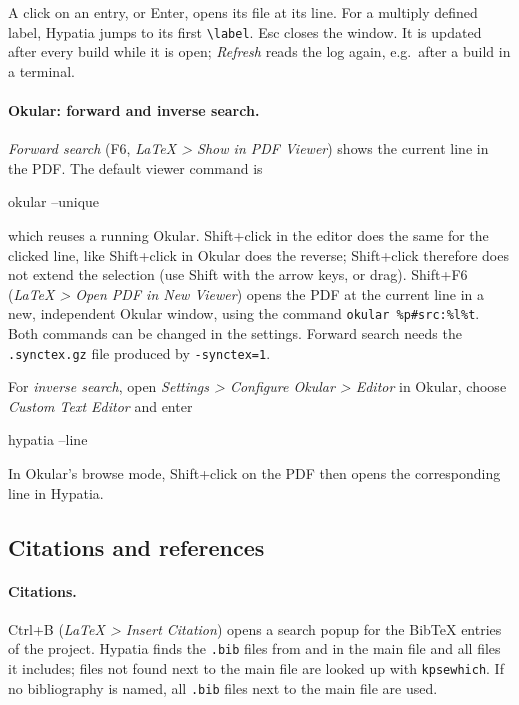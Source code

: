 \documentclass[11pt]{article}
\newcommand{\key}[1]{\textsf{#1}}
\newcommand{\menu}[1]{\textsf{\textit{#1}}}
\begin{document}
    A click on an entry, or \key{Enter}, opens its file at its line. For a multiply defined label, Hypatia jumps to its first \verb+\label+. \key{Esc} closes the window. It is updated after every build while it is open; \emph{Refresh} reads the log again, e.g.\ after a build in a terminal.

    \paragraph{Okular: forward and inverse search.}     \emph{Forward search} (\key{F6}, \menu{LaTeX > Show in PDF Viewer}) shows the current line in the PDF. The default viewer command is
    \begin{Code}
okular --unique %
    \end{Code}
    which reuses a running Okular. \key{Shift}+click in the editor does the same for the clicked line, like \key{Shift}+click in Okular does the reverse; Shift+click therefore does not extend the selection (use \key{Shift} with the arrow keys, or drag). \key{Shift+F6} (\menu{LaTeX > Open PDF in New Viewer}) opens the PDF at the current line in a new, independent Okular window, using the command \verb+okular %p#src:%l%t+. Both commands can be changed in the settings. Forward search needs the \verb+.synctex.gz+ file produced by \verb+-synctex=1+.

    For \emph{inverse search}, open \menu{Settings > Configure Okular > Editor} in Okular, choose \menu{Custom Text Editor} and enter
    \begin{Code}
hypatia --line %
    \end{Code}
    In Okular's browse mode, \key{Shift}+click on the PDF then opens the corresponding line in Hypatia.


    \subsection{Citations and references}\label{sec:citations}

    \paragraph{Citations.}     \key{Ctrl+B} (\menu{LaTeX > Insert Citation}) opens a search popup for the BibTeX entries of the project. Hypatia finds the \verb+.bib+ files from \verb++ and \verb++ in the main file and all files it includes; files not found next to the main file are looked up with \verb+kpsewhich+. If no bibliography is named, all \verb+.bib+ files next to the main file are used.
\end{document}

